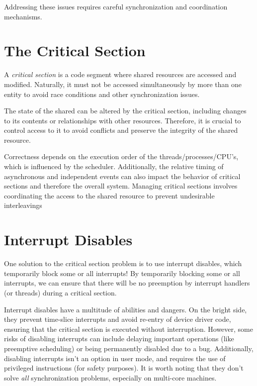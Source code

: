 \documentclass{report}
\newcommand{\definitionBegin}[1]{\begin{tcolorbox}[title={Definition: #1}]}
\newcommand{\definitionEnd}{\end{tcolorbox}}
\begin{document}
Addressing these issues requires careful synchronization and coordination mechanisms.





\section{The Critical Section}
\definitionBegin{Critical Section}
A \textit{critical section} is a code segment where shared resources are accessed and
modified. Naturally, it must not be accessed simultaneously by more than one entity to avoid race
conditions and other synchronization issues.
\definitionEnd

The state of the shared can be altered by the critical section, including changes to its contents or
relationships with other resources. Therefore, it is crucial to control access to it to avoid
conflicts and preserve the integrity of the shared resource.

Correctness depends on the execution order of the threads/processes/CPU's, which is influenced by
the scheduler. Additionally, the relative timing of asynchronous and independent events can also
impact the behavior of critical sections and therefore the overall system. Managing critical
sections involves coordinating the access to the shared resource to prevent undesirable interleavings





\section{Interrupt Disables}
One solution to the critical section problem is to use interrupt disables, which temporarily block
some or all interrupts! By temporarily blocking some or all interrupts, we can ensure that there
will be no preemption by interrupt handlers (or threads) during a critical section.

Interrupt disables have a multitude of abilities and dangers. On the bright side, they prevent
time-slice interrupts and avoid re-entry of device driver code, ensuring that the critical section
is executed without interruption. However, some risks of disabling interrupts can include delaying
important operations (like preemptive scheduling) or being permanently disabled due to a
bug. Additionally, disabling interrupts isn't an option in user mode, and requires the use of
privileged instructions (for safety purposes). It is worth noting that they don't solve \textit{all}
synchronization problems, especially on multi-core machines. 
\end{document}
